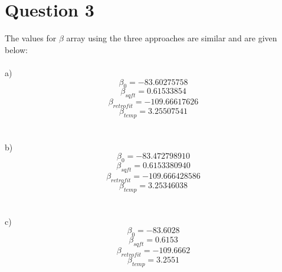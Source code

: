 \documentclass{article}
\begin{document}
\section{Question 3}
The values for $\beta$ array using the three approaches are similar and are given below:\\
\\a)
$$\beta_0 = -83.60275758$$
$$\beta_{sqft} = 0.61533854$$
$$\beta_{retrofit} =-109.66617626$$
$$\beta_{temp} = 3.25507541$$\\
\\b)
$$\beta_0 = -83.472798910$$
$$\beta_{sqft} = 0.6153380940$$
$$\beta_{retrofit} =-109.666428586$$
$$\beta_{temp} = 3.25346038$$\\
\\c)
$$\beta_0 = -83.6028$$
$$\beta_{sqft} = 0.6153$$
$$\beta_{retrofit} =-109.6662$$
$$\beta_{temp} = 3.2551$$
\end{document}
